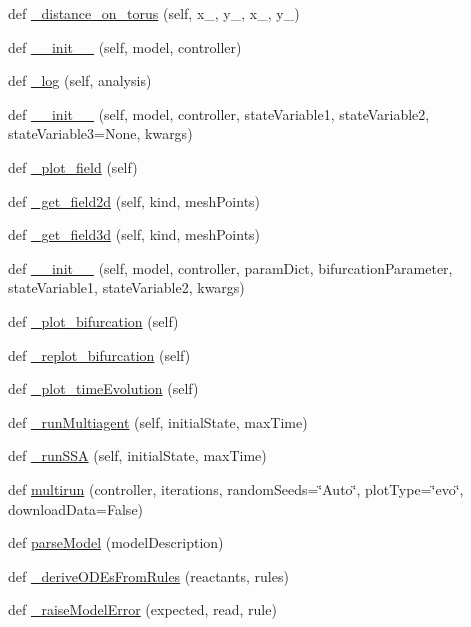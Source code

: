 \begin{DoxyCompactItemize}
\item 
def \hyperlink{namespace_mu_mo_t_a92221a87b590aea52f4445ed5b6469f7}{\+\_\+distance\+\_\+on\+\_\+torus} (self, x\+\_, y\+\_, x\+\_, y\+\_)
\item 
def \hyperlink{namespace_mu_mo_t_a916ec5c1c58f1743649c62f920747f0f}{\+\_\+\+\_\+init\+\_\+\+\_\+} (self, model, controller)
\item 
def \hyperlink{namespace_mu_mo_t_a8b4ffd0e4999bd45c6ca33fe0f40d1e3}{\+\_\+log} (self, analysis)
\item 
def \hyperlink{namespace_mu_mo_t_ad16271037ad2f176fb11e732cee937e3}{\+\_\+\+\_\+init\+\_\+\+\_\+} (self, model, controller, state\+Variable1, state\+Variable2, state\+Variable3=None, kwargs)
\item 
def \hyperlink{namespace_mu_mo_t_a686cf936270d6aa445bc25ca22a72c9a}{\+\_\+plot\+\_\+field} (self)
\item 
def \hyperlink{namespace_mu_mo_t_a6ae290cf5208a3e46fccaf16cb8d8093}{\+\_\+get\+\_\+field2d} (self, kind, mesh\+Points)
\item 
def \hyperlink{namespace_mu_mo_t_ac63e5b4de9db842ff58301f297815347}{\+\_\+get\+\_\+field3d} (self, kind, mesh\+Points)
\item 
def \hyperlink{namespace_mu_mo_t_a924dff9dd4d6ae1243a437a1bab2e368}{\+\_\+\+\_\+init\+\_\+\+\_\+} (self, model, controller, param\+Dict, bifurcation\+Parameter, state\+Variable1, state\+Variable2, kwargs)
\item 
def \hyperlink{namespace_mu_mo_t_a6ac5dc43aceda294b039dece390409ac}{\+\_\+plot\+\_\+bifurcation} (self)
\item 
def \hyperlink{namespace_mu_mo_t_acd290cbfcbbd99a5806f6f9783561884}{\+\_\+replot\+\_\+bifurcation} (self)
\item 
def \hyperlink{namespace_mu_mo_t_ace35072dcd3e51e67107f62b4de0d5fe}{\+\_\+plot\+\_\+time\+Evolution} (self)
\item 
def \hyperlink{namespace_mu_mo_t_af064a74ed8ab143feed91fa7d0cb94cd}{\+\_\+run\+Multiagent} (self, initial\+State, max\+Time)
\item 
def \hyperlink{namespace_mu_mo_t_a897acb21cb778ef4c9954e5ab0a71a27}{\+\_\+run\+S\+SA} (self, initial\+State, max\+Time)
\item 
def \hyperlink{namespace_mu_mo_t_a5f588d13e4c113e7e9a6f862112558cc}{multirun} (controller, iterations, random\+Seeds=\char`\"{}Auto\char`\"{}, plot\+Type=\char`\"{}evo\char`\"{}, download\+Data=False)
\item 
def \hyperlink{namespace_mu_mo_t_a563aad4a460dbcc0705cf99bb6f6dd5d}{parse\+Model} (model\+Description)
\item 
def \hyperlink{namespace_mu_mo_t_a276566fb102dd4e4bf32a9ba4fb8a09b}{\+\_\+derive\+O\+D\+Es\+From\+Rules} (reactants, rules)
\item 
def \hyperlink{namespace_mu_mo_t_a07dd350ff74bc1abafd7f44f972089a2}{\+\_\+raise\+Model\+Error} (expected, read, rule)
\end{DoxyCompactItemize}
